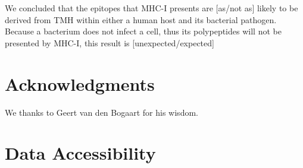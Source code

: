 \documentclass{article}
\newcommand{\frans}[1]{\textcolor{blue}{\textbf{[FB: #1]}}}
\newcommand{\richel}[1]{\textcolor{orange}{\textbf{[RB: #1]}}}
\begin{document}
We concluded that the
epitopes that MHC-I presents are [as/not as] likely 
to be derived from TMH within either a human host and its bacterial pathogen.
Because a bacterium does not infect a cell, thus its polypeptides
will not be presented by MHC-I, this result is [unexpected/expected]



\section{Acknowledgments}

We thanks to Geert van den Bogaart for his wisdom.

\section{Data Accessibility}
\end{document}
